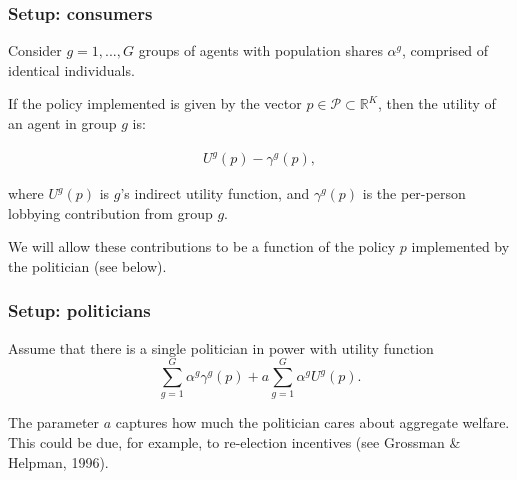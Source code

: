 \documentclass[11pt,aspectratio=169]{beamer}
\begin{document}
\begin{frame}
\frametitle{Setup: consumers}

Consider $g=1,...,G$ groups of agents with population shares $\alpha^g$, comprised of identical individuals.

\pause 

If the policy implemented is given by the vector $p\in \mathcal{P}\subset \mathbb{R}^{K}$, then the utility of an agent in group $g$ is: 

\begin{eqnarray*}
U^g(p) -\gamma^g(p),
\end{eqnarray*} 

where $U^{g}\left( p\right)$ is $g$'s indirect utility function, and $\gamma ^{g}\left( p\right) $ is the per-person lobbying contribution from group $g$.

\pause 
We will allow these contributions to be a function of the policy $p$ implemented by the politician (see below).


\end{frame}



\begin{frame}
\frametitle{Setup: politicians}

Assume that there is a single politician in power with utility function
\begin{equation}
\sum_{g=1}^{G}\alpha ^{g}\gamma ^{g}\left( p\right)
+a\sum_{g=1}^{G}\alpha ^{g}U^{g}\left( p\right).  \label{politician welfare}
\end{equation} 

\pause 

The parameter $a$ captures how much the politician cares about aggregate welfare. This could be due, for example, to re-election incentives (see Grossman \& Helpman, 1996). 

\end{frame}
\end{document}
